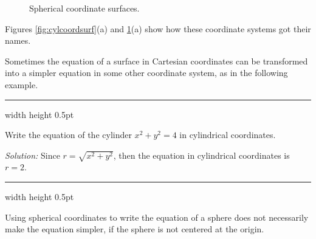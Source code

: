 \begin{figure}[h]
{}
 \caption[]{\quad Spherical coordinate surfaces.}
 \label{fig:sphcoordsurf}
\end{figure}

Figures \ref{fig:cylcoordsurf}(a) and \ref{fig:sphcoordsurf}(a) show how these coordinate systems got their names.

Sometimes the equation of a surface in Cartesian coordinates can be transformed into a simpler equation in some other
coordinate system, as in the following example.

\vspace{2mm}
\hrule width \textwidth height 0.5pt
\begin{exmp}
 Write the equation of the cylinder $x^2 + y^2 = 4$ in cylindrical coordinates.\vspace{1mm}
 \par\noindent \emph{Solution:} Since $r = \sqrt{x^2 + y^2}$, then the equation in cylindrical
 coordinates is $r =2$.
\end{exmp}
\hrule width \textwidth height 0.5pt
\vspace{2mm}

Using spherical coordinates to write the equation of a sphere does not necessarily make the
equation simpler, if the sphere is not centered at the origin.

